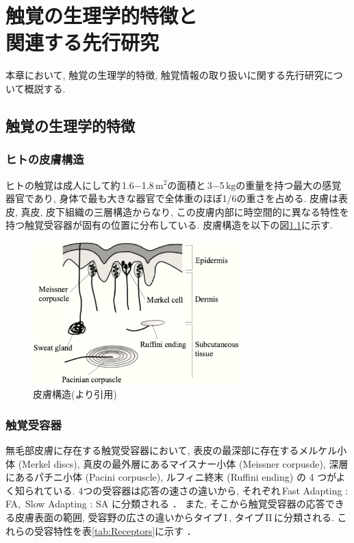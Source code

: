 
\chapter{触覚の生理学的特徴と\\関連する先行研究}
\label{chap:haptic}
本章において,  触覚の生理学的特徴, 触覚情報の取り扱いに関する先行研究について概説する.  

\section{触覚の生理学的特徴}
\subsection{ヒトの皮膚構造}
ヒトの触覚は成人にして約\,1.6$-$1.8\,$\mathrm{m^2}$の面積と\,3$-$5\,$\mathrm{kg}$の重量を持つ最大の感覚器官であり,  身体で最も大きな器官で全体重のほぼ1/6の重さを占める.  皮膚は表皮, 真皮, 皮下組織の三層構造からなり, この皮膚内部に時空間的に異なる特性を持つ触覚受容器が固有の位置に分布している. 皮膚構造を以下の図\ref{fig:skin}に示す. 
\begin{figure}[H]
\begin{center}
\includegraphics[width=8cm]{eps/skin_str.eps}
\caption{皮膚構造(\cite{mechanizm}より引用)}
\label{fig:skin}
\end{center}
\end{figure}

\subsection{触覚受容器}
無毛部皮膚に存在する触覚受容器において,  表皮の最深部に存在するメルケル小体 (Merkel discs), 真皮の最外層にあるマイスナー小体 (Meissner corpusde), 深層にあるパチニ小体 (Pacini corpuscle), ルフィニ終末 (Ruffini ending) の 4 つがよく知られている.
4つの受容器は応答の速さの違いから,  それぞれ\,Fast Adapting : FA,  \,Slow Adapting : SA に分類される \cite{1984438}．
また,  そこから触覚受容器の応答できる皮膚表面の範囲,  受容野の広さの違いからタイプ\rm\,I\,,  タイプ\rm\,II\,に分類される. 
これらの受容特性を表\ref{tab:Receptors}に示す \cite{前野隆司2000器用な手}．%


